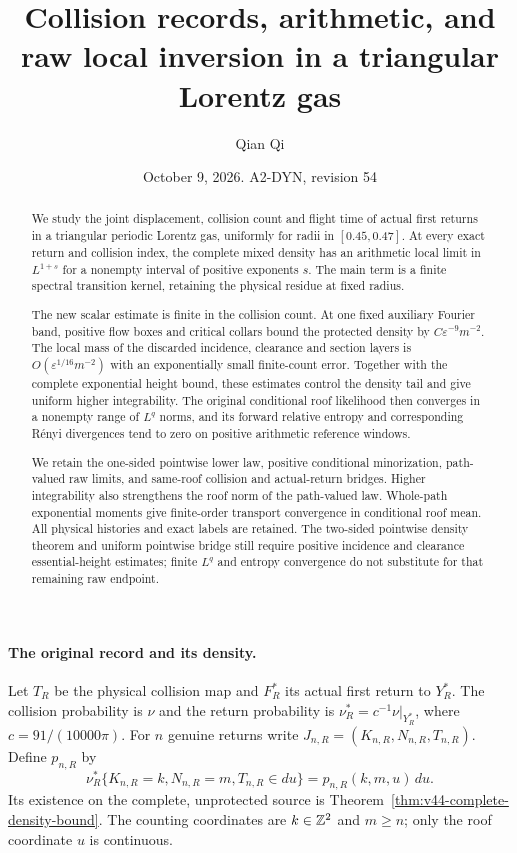 \documentclass[11pt,reqno]{amsart}
\title[Collision records and raw local inversion]{Collision records, arithmetic, and raw local inversion in a triangular Lorentz gas}
\author{Qian Qi}
\date{October 9, 2026. A2-DYN, revision 54}
\numberwithin{equation}{section}
\theoremstyle{definition}\newtheorem{definition}[theorem]{Definition}
\theoremstyle{remark}\newtheorem{remark}[theorem]{Remark}
\begin{document}
\raggedbottom
\begin{abstract}
We study the joint displacement, collision count and flight time of
actual first returns in a triangular periodic Lorentz gas, uniformly
for radii in $[0.45,0.47]$. At every exact return and collision index,
the complete mixed density has an arithmetic local limit in
$L^{1+s}$ for a nonempty interval of positive exponents $s$.
The main term is a finite spectral transition kernel, retaining the
physical residue at fixed radius.

The new scalar estimate is finite in the collision count. At one fixed
auxiliary Fourier band, positive flow boxes and critical collars bound
the protected density by $C\varepsilon^{-9}m^{-2}$. The local mass of
the discarded incidence, clearance and section layers is
$O(\varepsilon^{1/16}m^{-2})$ with an exponentially small finite-count
error. Together with the complete exponential height bound, these
estimates control the density tail and give uniform higher
integrability. The original conditional roof likelihood then converges
in a nonempty range of $L^q$ norms, and its forward relative entropy
and corresponding R\'enyi divergences tend to zero on positive
arithmetic reference windows.

We retain the one-sided pointwise lower law, positive conditional
minorization, path-valued raw limits, and same-roof collision and
actual-return bridges. Higher integrability also strengthens the
roof norm of the path-valued law. Whole-path exponential moments give
finite-order transport convergence in conditional roof mean. All
physical histories and exact labels are retained. The two-sided
pointwise density theorem and uniform pointwise bridge still require
positive incidence and clearance essential-height estimates; finite
$L^q$ and entropy convergence do not substitute for that remaining
raw endpoint.
\end{abstract}
\maketitle

\paragraph{The original record and its density.}
Let $T_R$ be the physical collision map and $F_R^*$ its actual first
return to $Y_R^*$. The collision probability is $\nu$ and the return
probability is $\nu_R^*=c^{-1}\nu|_{Y_R^*}$, where
$c=91/(10000\pi)$. For $n$ genuine returns write
$J_{n,R}=(K_{n,R},N_{n,R},T_{n,R})$. Define $p_{n,R}$ by
\[
 \nu_R^*\{K_{n,R}=k,N_{n,R}=m,T_{n,R}\in du\}
                  =p_{n,R}(k,m,u)\,du.
\]
Its existence on the complete, unprotected source is
Theorem~\ref{thm:v44-complete-density-bound}. The counting coordinates
are $k\in\mathbb Z^2$ and $m\ge n$; only the roof coordinate $u$ is continuous.
\end{document}
